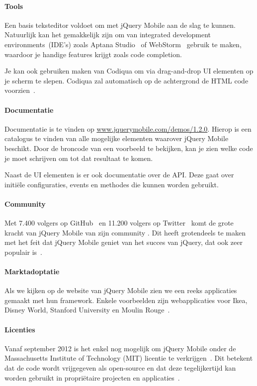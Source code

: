 \paragraph{Tools}
Een basis teksteditor voldoet om met jQuery Mobile aan de slag te kunnen. Natuurlijk kan het gemakkelijk zijn om van integrated development environments~(IDE's) zoals Aptana Studio~\cite{Aptana2012} of WebStorm~\cite{JetBrains2012} gebruik te maken, waardoor je handige features krijgt zoals code completion.

Je kan ook gebruiken maken van Codiqua om via drag-and-drop UI elementen op je scherm te slepen. Codiqua zal automatisch op de achtergrond de HTML code voorzien~\cite{Sperry2012}.

\paragraph{Documentatie}
Documentatie is te vinden op \url{www.jquerymobile.com/demos/1.2.0}. Hierop is een catalogus te vinden van alle mogelijke elementen waarover jQuery Mobile beschikt. Door de broncode van een voorbeeld te bekijken, kan je zien welke code je moet schrijven om tot dat resultaat te komen.

Naast de UI elementen is er ook documentatie over de API. Deze gaat over initiële configuraties, events en methodes die kunnen worden gebruikt.

\paragraph{Community}
Met 7.400 volgers op GitHub~\cite{GitHub2012} en 11.200 volgers op Twitter~\cite{Twitter2012} komt de grote kracht van jQuery Mobile van zijn community . Dit heeft grotendeels te maken met het feit dat jQuery Mobile geniet van het succes van jQuery, dat ook zeer populair is~\cite{Hales2012}.

\paragraph{Marktadoptatie}
Als we kijken op de website van jQuery Mobile zien we een reeks applicaties gemaakt met hun framework. Enkele voorbeelden zijn webapplicaties voor Ikea, Disney World, Stanford University en Moulin Rouge~\cite{JQuery2012a}. 

\paragraph{Licenties}
Vanaf september 2012 is het enkel nog mogelijk om jQuery Mobile onder de Massachusetts Institute of Technology (MIT) licentie te verkrijgen~\cite{Dmethvin2012}. Dit betekent dat de code wordt vrijgegeven als open-source en dat deze tegelijkertijd kan worden gebruikt in propriëtaire projecten en applicaties~\cite{PhilDutson2012}.

